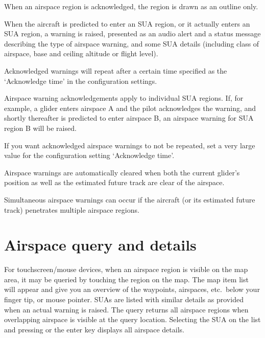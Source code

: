 When an airspace region is acknowledged, the region is drawn as an
outline only.

When the aircraft is predicted to enter an SUA region, or it actually
enters an SUA region, a warning is raised, presented as an audio alert
and a status message describing the type of airspace warning, and some SUA
details (including class of airspace, base and ceiling altitude or
flight level).

Acknowledged warnings will repeat after a certain time specified as
the `Acknowledge time' in the configuration settings.

Airspace warning acknowledgements apply to individual SUA regions.
If, for example, a glider enters airspace A and the pilot acknowledges
the warning, and shortly thereafter is predicted to enter airspace B,
an airspace warning for SUA region B will be raised.

\tip If you want acknowledged airspace warnings to not be repeated,
set a very large value for the configuration setting `Acknowledge
time'.

Airspace warnings are automatically cleared when both the current
glider's position as well as the estimated future track are clear
of the airspace.

Simultaneous airspace warnings can occur if the aircraft (or its
estimated future track) penetrates multiple airspace regions.


\section{Airspace query and details}

For touchscreen/mouse devices, when an airspace region is visible on
the map area, it may be queried by touching the region on the map.  
The map item list will appear and give you an overview of the waypoints, 
airspaces, etc.\ below your finger tip, or mouse pointer.  SUAs are listed with
similar details as provided when an actual warning is raised.  
The query returns all airspace regions when overlapping airspace is visible at 
the query location.
Selecting the SUA on the list and pressing  or the enter key 
displays all airspace details. 


